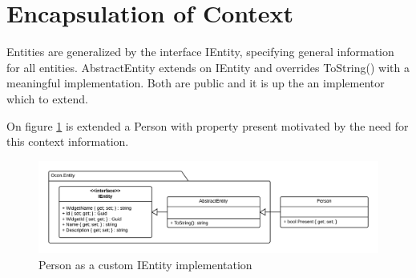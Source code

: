 \documentclass[../report.tex]{subfiles}
\begin{document}
\graphicspath{{img/}{../img/}}












\section{Encapsulation of Context}

Entities are generalized by the interface IEntity, specifying general information for all entities. AbstractEntity extends on IEntity and overrides ToString() with a meaningful implementation. Both are public and it is up the an implementor which to extend.

On figure \ref{fig:PersonImplementation} is extended a Person with property present motivated by the need for this context information.


\begin{figure}[H]
\includegraphics[width=\linewidth]{customEntityClass.png}
\caption{Person as a custom IEntity implementation}
\label{fig:PersonImplementation}
\end{figure}
\end{document}
